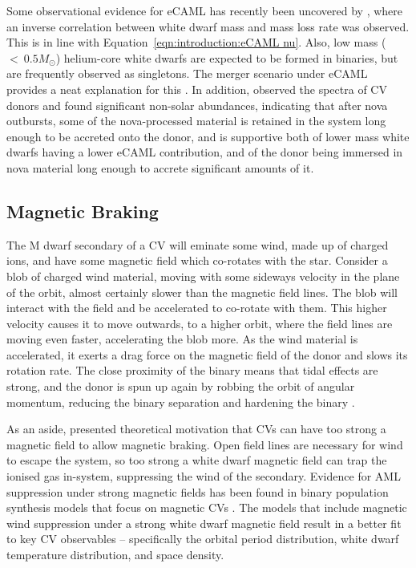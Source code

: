 Some observational evidence for eCAML has recently been uncovered by \citet{Pala2021}, where an inverse correlation between white dwarf mass and mass loss rate was observed. This is in line with Equation~\ref{eqn:introduction:eCAML nu}. 
Also, low mass ($<~0.5M_\odot$) helium-core white dwarfs are expected to be formed in binaries, but are frequently observed as singletons. The merger scenario under eCAML provides a neat explanation for this \citep{zorotovic2017}.
In addition, \citet{sparks2021} observed the spectra of CV donors and found significant non-solar abundances,  indicating that after nova outbursts, some of the nova-processed material is retained in the system long enough to be accreted onto the donor, and is supportive both of lower mass white dwarfs having a lower eCAML contribution, and of the donor being immersed in nova material long enough to accrete significant amounts of it. 


\subsection{Magnetic Braking}
\label{sect:introduction:magnetic braking}

The M dwarf secondary of a CV will eminate some wind, made up of charged ions, and have some magnetic field which co-rotates with the star.
Consider a blob of charged wind material, moving with some sideways velocity in the plane of the orbit, almost certainly slower than the magnetic field lines. 
The blob will interact with the field and be accelerated to co-rotate with them.
This higher velocity causes it to move outwards, to a higher orbit, where the field lines are moving even faster, accelerating the blob more. 
As the wind material is accelerated, it exerts a drag force on the magnetic field of the donor and slows its rotation rate.
The close proximity of the binary means that tidal effects are strong, and the donor is spun up again by robbing the orbit of angular momentum, reducing the binary separation and hardening the binary \citep{verbunt1981}.

As an aside, \citet{wickramasinghe1996} presented theoretical motivation that CVs can have too strong a magnetic field to allow magnetic braking. Open field lines are necessary for wind to escape the system, so too strong a white dwarf magnetic field can trap the ionised gas in-system, suppressing the wind of the secondary. 
Evidence for AML suppression under strong magnetic fields has been found in binary population synthesis models that focus on magnetic CVs \citep{belloni2020}. The models that include magnetic wind suppression under a strong white dwarf magnetic field result in a better fit to key CV observables -- specifically the orbital period distribution, white dwarf temperature distribution, and space density.

